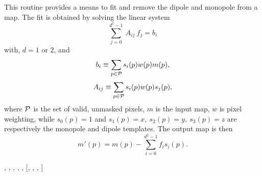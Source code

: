 
\sloppy


 \section[remove\_dipole*]{ }
\label{sub:remove_dipole}
\author{Eric Hivon}
\newcommand{\vecf}{{\rm{ \bf f}}}
\newcommand{\vecb}{{\rm{ \bf b}}}
\newcommand{\matA}{{\rm{ \bf A}}}
\newcommand{\calP}{\cal{P}}

\begin{facility}
{This routine provides a means to fit and remove the dipole and monopole
from a \healpix map. The fit is obtained by solving the linear system
\begin{equation}
	\label{eq:remove_dipole_a}
	\sum_{j=0}^{d^2-1}\ A_{ij}\ f_j = b_i
\end{equation}
 with, $d=1$ or $2$, and
\begin{equation}
	\label{eq:remove_dipole_b}
	b_i \equiv \sum_{p \in \calP} s_i(p) w(p) m(p),
\end{equation}
\begin{equation}
	\label{eq:remove_dipole_c}
	A_{ij} \equiv \sum_{p \in \calP} s_i(p) w(p) s_j(p),
\end{equation}
 where $\calP$ is the set of
valid, unmasked pixels, $m$ is the input map, $w$ is pixel weighting, while
$s_0(p) = 1$ and $s_1(p)=x,\ s_2(p)=y,\ s_3(p)=z$ are
respectively the monopole and dipole templates. The output map is then
\begin{equation}
	\label{eq:remove_dipole_d}
	m'(p) = m(p) - \sum_{i=0}^{d^2-1} f_i s_i(p).
\end{equation}
}
{\modPixTools}
\end{facility}

\begin{f90format}
{%
, %
, %
, %
, %
, %
 [, %
, %
, %
]}
\end{f90format}

